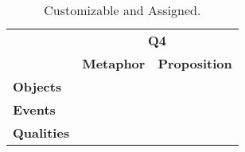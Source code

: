 \begin{table}[!htbp]
\centering
\begin{tabular}{l|l|l|}
\cline{2-3}
                                         & \multicolumn{2}{c|}{\textbf{Q4}}         \\ \cline{2-3} 
                                         & \textbf{Metaphor} & \textbf{Proposition} \\ \hline
\multicolumn{1}{|l|}{\textbf{Objects}}   &                   &                      \\ \hline
\multicolumn{1}{|l|}{\textbf{Events}}    &                   &                      \\ \hline
\multicolumn{1}{|l|}{\textbf{Qualities}} &                   &                      \\ \hline
\end{tabular}
\caption{Customizable and Assigned.}
\end{table}
\FloatBarrier
